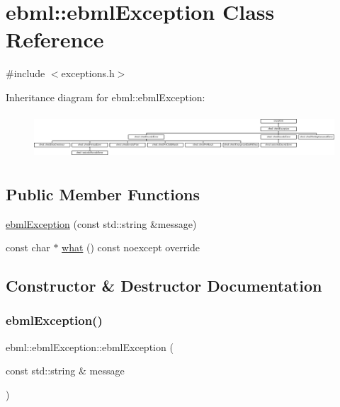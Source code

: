\hypertarget{classebml_1_1ebmlException}{}\section{ebml\+:\+:ebml\+Exception Class Reference}
\label{classebml_1_1ebmlException}


{\ttfamily \#include $<$exceptions.\+h$>$}

Inheritance diagram for ebml\+:\+:ebml\+Exception\+:\begin{figure}[H]
\begin{center}
\leavevmode
\includegraphics[height=1.699029cm]{classebml_1_1ebmlException}
\end{center}
\end{figure}
\subsection*{Public Member Functions}
\begin{DoxyCompactItemize}
\item 
\mbox{\hyperlink{classebml_1_1ebmlException_a0864653686e2432f259c8b3cbd5186af}{ebml\+Exception}} (const std\+::string \&message)
\item 
const char $\ast$ \mbox{\hyperlink{classebml_1_1ebmlException_a63892a18e5ba1fdee6abde1dd4869df8}{what}} () const noexcept override
\end{DoxyCompactItemize}


\subsection{Constructor \& Destructor Documentation}
\mbox{\label{classebml_1_1ebmlException_a0864653686e2432f259c8b3cbd5186af}} 
\subsubsection{\texorpdfstring{ebml\+Exception()}{ebmlException()}}
{\footnotesize\ttfamily ebml\+::ebml\+Exception\+::ebml\+Exception (\begin{DoxyParamCaption}\item[{const std\+::string \&}]{message }\end{DoxyParamCaption})}



